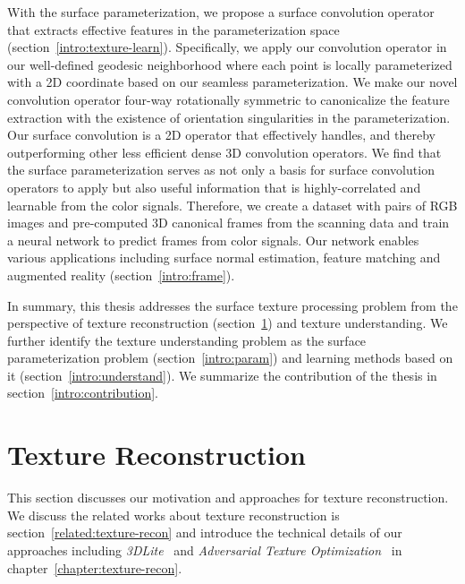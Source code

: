 With the surface parameterization, we propose a surface convolution operator that extracts effective features in the parameterization space (section~\ref{intro:texture-learn}).
%
Specifically, we apply our convolution operator in our well-defined geodesic neighborhood where each point is locally parameterized with a 2D coordinate based on our seamless parameterization.
%
We make our novel convolution operator four-way rotationally symmetric to canonicalize the feature extraction with the existence of orientation singularities in the parameterization.
%
Our surface convolution is a 2D operator that effectively handles, and thereby outperforming other less efficient dense 3D convolution operators.
%
We find that the surface parameterization serves as not only a basis for surface convolution operators to apply but also useful information that is highly-correlated and learnable from the color signals. Therefore, we create a dataset with pairs of RGB images and pre-computed 3D canonical frames from the scanning data and train a neural network to predict frames from color signals. Our network enables various applications including surface normal estimation, feature matching and augmented reality (section~\ref{intro:frame}).

In summary, this thesis addresses the surface texture processing problem from the perspective of texture reconstruction (section~\ref{intro:texture-recon}) and texture understanding. We further identify the texture understanding problem as the surface parameterization problem (section~\ref{intro:param}) and learning methods based on it (section~\ref{intro:understand}). We summarize the contribution of the thesis in section~\ref{intro:contribution}.

\section{Texture Reconstruction}
\label{intro:texture-recon}
This section discusses our motivation and approaches for texture reconstruction. We discuss the related works about texture reconstruction is section~\ref{related:texture-recon} and introduce the technical details of our approaches including \textit{3DLite}~\cite{huang20173dlite} and \textit{Adversarial Texture Optimization}~\cite{huang2020adversarial} in chapter~\ref{chapter:texture-recon}.

